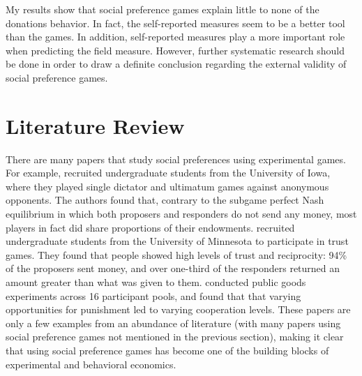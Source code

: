 \documentclass[12pt]{article}
\begin{document}
My results show that social preference games explain little to none of the donations behavior. In fact, the self-reported measures seem to be a better tool than the games. In addition, self-reported measures play a more important role when predicting the field measure. However, further systematic research should be done in order to draw a definite conclusion regarding the external validity of social preference games. 


\section{Literature Review}

There are many papers that study social preferences using experimental games. For example, \cite{forsythe_1994} recruited undergraduate students from the University of Iowa, where they played single dictator and ultimatum games against anonymous opponents. The authors found that, contrary to the subgame perfect Nash equilibrium in which both proposers and responders do not send any money, most players in fact did share proportions of their endowments. \cite{berg_1995} recruited undergraduate students from the University of Minnesota to participate in trust games. They found that people showed high levels of trust and reciprocity: 94\% of the proposers sent money, and over one-third of the responders returned an amount greater than what was given to them. \cite{hermann_thoni_gachter_2008} conducted public goods experiments across 16 participant pools, and found that that varying opportunities for punishment led to varying cooperation levels. These papers are only a few examples from an abundance of literature (with many papers using social preference games not mentioned in the previous section), making it clear that using social preference games has become one of the building blocks of experimental and behavioral economics. 
 
\end{document}
